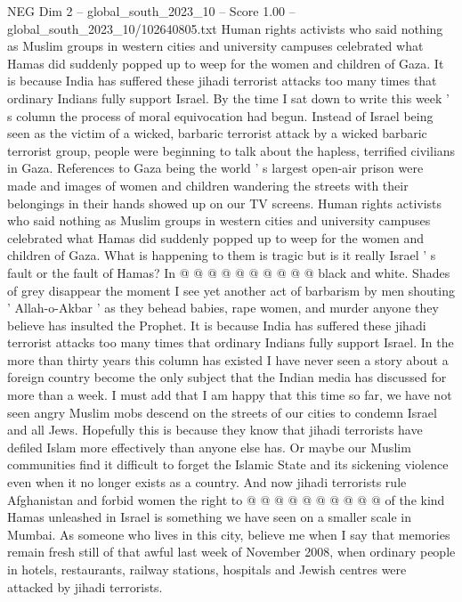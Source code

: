 \begin{textsample}{NEG Dim 2 – global\_south\_2023\_10 – Score 1.00 – global\_south\_2023\_10/102640805.txt}  \label{ex:f2_neg_392}
Human rights activists who said nothing as Muslim groups in western cities and university campuses celebrated what Hamas did suddenly popped up to weep for the women and children of Gaza.
It is because India has suffered these jihadi terrorist attacks too many times that ordinary Indians fully support Israel.
By the time I sat down to write this week ' s column the process of moral equivocation had begun.
Instead of Israel being seen as the victim of a wicked, barbaric terrorist attack by a wicked barbaric terrorist group, people were beginning to talk about the hapless, terrified civilians in Gaza.
References to Gaza being the world ' s largest open-air prison were made and images of women and children wandering the streets with their belongings in their hands showed up on our TV screens.
Human rights activists who said nothing as Muslim groups in western cities and university campuses celebrated what Hamas did suddenly popped up to weep for the women and children of Gaza.
What is happening to them is tragic but is it really Israel ' s fault or the fault of Hamas?
In @ @ @ @ @ @ @ @ @ @ black and white.
Shades of grey disappear the moment I see yet another act of barbarism by men shouting ' Allah-o-Akbar ' as they behead babies, rape women, and murder anyone they believe has insulted the Prophet.
It is because India has suffered these jihadi terrorist attacks too many times that ordinary Indians fully support Israel.
In the more than thirty years this column has existed I have never seen a story about a foreign country become the only subject that the Indian media has discussed for more than a week.
I must add that I am happy that this time so far, we have not seen angry Muslim mobs descend on the streets of our cities to condemn Israel and all Jews.
Hopefully this is because they know that jihadi terrorists have defiled Islam more effectively than anyone else has.
Or maybe our Muslim communities find it difficult to forget the Islamic State and its sickening violence even when it no longer exists as a country.
And now jihadi terrorists rule Afghanistan and forbid women the right to @ @ @ @ @ @ @ @ @ @ of the kind Hamas unleashed in Israel is something we have seen on a smaller scale in Mumbai.
As someone who lives in this city, believe me when I say that memories remain fresh still of that awful last week of November 2008, when ordinary people in hotels, restaurants, railway stations, hospitals and Jewish centres were attacked by jihadi terrorists.

\end{textsample}
